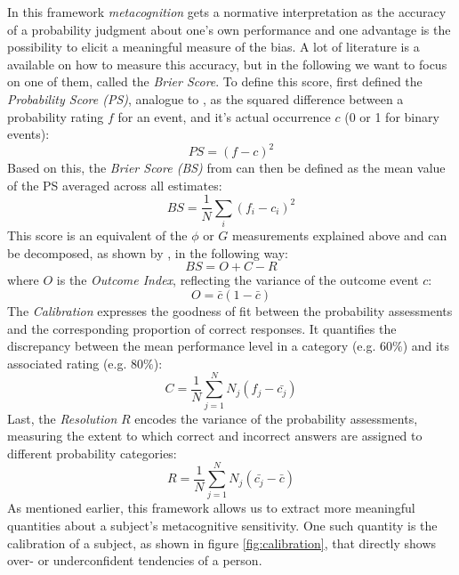 \documentclass[../main/main.tex]{subfiles}
\begin{document}
	In this framework \textit{metacognition} gets a normative interpretation as the accuracy of a probability judgment about one's own performance and one advantage is the possibility to elicit a meaningful measure of the bias. A lot of literature is a available on how to measure this accuracy, but in the following we want to focus on one of them, called the \textit{Brier Score}. To define this score, \cite{fleming2014measure} first defined the \textit{Probability Score (PS)}, analogue to \cite{harvey1997confidence}, as the squared difference between a probability rating $f$ for an event, and it's actual occurrence $c$ (0 or 1 for binary events):
	\begin{displaymath}
			PS = (f - c)^2
	\end{displaymath}
	Based on this, the \textit{Brier Score (BS)} from \cite{brier1950verification} can then be defined as the mean value of the PS averaged across all estimates:
	\begin{displaymath}
			BS = \frac{1}{N}\sum_i(f_i - c_i)^2
	\end{displaymath}
	This score is an equivalent of the $\phi$ or $G$ measurements explained above and can be decomposed, as shown by \cite{murphy1973new}, in the following way:
	\begin{displaymath}
		BS = O + C - R
	\end{displaymath}
	where $O$ is the \textit{Outcome Index}, reflecting the variance of the outcome event $c$:
	\begin{displaymath}
		O = \bar{c}(1-\bar{c})
	\end{displaymath}
	The \textit{Calibration} expresses the goodness of fit between the probability assessments and the corresponding proportion of correct responses. It quantifies the discrepancy between the mean performance level in a category (e.g. $60\%$) and its associated rating (e.g. $80\%$):
	\begin{displaymath}
		C = \frac{1}{N}\sum_{j=1}^{N}N_j(f_j - \bar{c_j})
	\end{displaymath}
	Last, the \textit{Resolution} $R$ encodes the variance of the probability assessments, measuring the extent to which correct and incorrect answers are assigned to different probability categories:
	\begin{displaymath}
		R = \frac{1}{N}\sum_{j=1}^{N}N_j(\bar{c_j} - \bar{c})
	\end{displaymath}
	As mentioned earlier, this framework allows us to extract more meaningful quantities about a subject's metacognitive sensitivity. One such quantity is the calibration of a subject, as shown in figure \ref{fig:calibration}, that directly shows over- or underconfident tendencies of a person.
\end{document}
